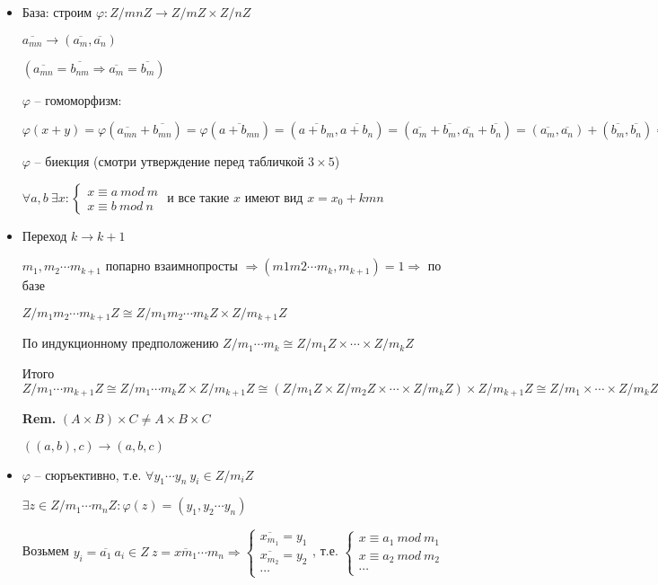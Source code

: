 \documentclass[14pt, letter paper]{article}
\begin{document}
\begin{itemize}
    \item База: строим $\varphi : Z/mnZ \rightarrow Z/mZ \times Z/nZ$

    $\overline{a_{mn}} \rightarrow (\overline{a_m}, \overline{a_n})$
    
    $(\overline{a_{mn}} = \overline{b_{nm}} \Rightarrow \overline{a_m} = \overline{b_m})$
    
    $\varphi$ -- гомоморфизм:
    
    $\varphi(x + y) = \varphi(\overline{a_{mn}} + \overline{b_{mn}}) = \varphi (\overline{a + b_{mn}}) = (\overline{a + b_m}, \overline{a + b_n}) = (\overline{a_m} + \overline{b_m}, \overline{a_n} + \overline{b_n}) = (\overline{a_m}, \overline{a_n}) + (\overline{b_m}, \overline{b_n}) = \varphi(x) + \varphi(y)$
    
    $\varphi$ -- биекция (смотри утверждение перед табличкой $3 \times 5$)
    
    $\forall a, b\ \exists x :\begin{cases}
        x \equiv a\ mod\ m \\
        x \equiv b\ mod\ n 
    \end{cases}$ и все такие $x$ имеют вид $x = x_0 + kmn$

    \item Переход $k \rightarrow k + 1$

    $m_1, m_2 \cdots m_{k+1}$ попарно взаимнопросты $\Rightarrow (m1m2\cdots m_k, m_{k+1}) = 1 \Rightarrow$ по базе

    $Z/m_1m_2\cdots m_{k+1}Z \cong Z/m_1m_2 \cdots m_kZ \times Z/m_{k+1}Z$

    По индукционному предположению $Z/m_1\cdots m_k \cong Z/m_1Z \times \cdots \times Z/m_kZ$

    Итого $Z/m_1\cdots m_{k+1}Z \cong Z/m_1\cdots m_kZ \times Z/m_{k+1}Z \cong (Z/m_1Z \times Z/m_2Z \times \cdots \times Z/m_kZ) \times Z/m_{k+1}Z \cong Z/m_1 \times \cdots \times Z/m_kZ \times Z/m_{k+1}Z$

    \textbf{Rem.} $(A \times B) \times C \neq A \times B \times C$

    $((a, b), c) \rightarrow (a, b, c)$

    \item $\varphi$ -- сюръективно, т.е. $\forall y_1 \cdots y_n\ y_i \in Z/m_iZ$

    $\exists z \in Z/m_1\cdots m_nZ : \varphi(z) = (y_1, y_2 \cdots y_n)$

    Возьмем $y_i = \overline{a_1}\ a_i \in Z\ z = \overline{xm_1}\cdots m_n \Rightarrow \begin{cases}
        \overline{x_{m_1}} = y_1 \\
        \overline{x_{m_2}} = y_2 \\
        \cdots
    \end{cases}$, т.е. $\begin{cases}
        x \equiv a_1\ mod\ m_1 \\
        x \equiv a_2\ mod\ m_2 \\
        \cdots
    \end{cases}$


\end{itemize}
\end{document}
